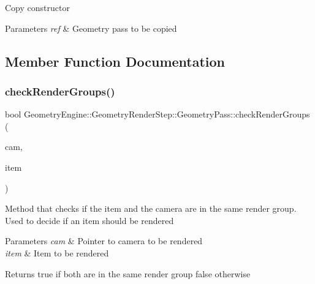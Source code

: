 Copy constructor 
\begin{DoxyParams}{Parameters}
{\em ref} & Geometry pass to be copied \\
\hline
\end{DoxyParams}


\subsection{Member Function Documentation}
\mbox{\label{class_geometry_engine_1_1_geometry_render_step_1_1_geometry_pass_af37e4ae472e97482eed93fc443438b2e}} 
\subsubsection{\texorpdfstring{checkRenderGroups()}{checkRenderGroups()}}
{\footnotesize\ttfamily bool Geometry\+Engine\+::\+Geometry\+Render\+Step\+::\+Geometry\+Pass\+::check\+Render\+Groups (\begin{DoxyParamCaption}\item[{\mbox{\hyperlink{class_geometry_engine_1_1_geometry_world_item_1_1_geometry_camera_1_1_camera}{Geometry\+World\+Item\+::\+Geometry\+Camera\+::\+Camera}} $\ast$}]{cam,  }\item[{\mbox{\hyperlink{class_geometry_engine_1_1_geometry_world_item_1_1_geometry_item_1_1_geometry_item}{Geometry\+World\+Item\+::\+Geometry\+Item\+::\+Geometry\+Item}} $\ast$}]{item }\end{DoxyParamCaption})\hspace{0.3cm}{\ttfamily [protected]}}

Method that checks if the item and the camera are in the same render group. Used to decide if an item should be rendered 
\begin{DoxyParams}{Parameters}
{\em cam} & Pointer to camera to be rendered \\
\hline
{\em item} & Item to be rendered \\
\hline
\end{DoxyParams}
\begin{DoxyReturn}{Returns}
true if both are in the same render group false otherwise 
\end{DoxyReturn}
\mbox{\label{class_geometry_engine_1_1_geometry_render_step_1_1_geometry_pass_a12e85a0169cb7b92cb8bd7b7fe100b33}} 
